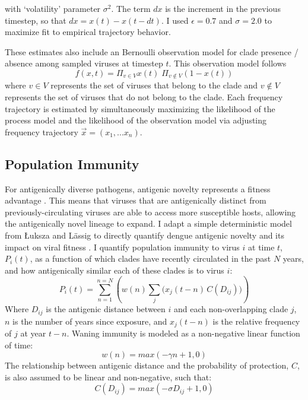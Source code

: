 with `volatility' parameter $\sigma^2$.
The term $dx$ is the increment in the previous timestep, so that $dx = x(t) - x(t-dt)$.
I used $\epsilon = 0.7$ and $\sigma = 2.0$ to maximize fit to empirical trajectory behavior.

These estimates also include an Bernoulli observation model for clade presence / absence among sampled viruses at timestep $t$.
This observation model follows
\begin{equation}
f(x,t) = \Pi_{v \in V} x(t) \; \Pi_{v \notin V} (1-x(t))
\end{equation}
where $v \in V$ represents the set of viruses that belong to the clade and $v \notin V$ represents the set of viruses that do not belong to the clade.
Each frequency trajectory is estimated by simultaneously maximizing the likelihood of the process model and the likelihood of the observation model via adjusting frequency trajectory $\vec{x} = (x_1, ... x_n)$.

\subsection*{Population Immunity}
For antigenically diverse pathogens, antigenic novelty represents a fitness advantage \citep{lipsitch2007patterns}.
This means that viruses that are antigenically distinct from previously-circulating viruses are able to access more susceptible hosts, allowing the antigenically novel lineage to expand.
I adapt a simple deterministic model from {\L}uksza and L\"assig to directly quantify dengue antigenic novelty and its impact on viral fitness \citep{luksza2014predictive}.
I quantify population immunity to virus $i$ at time $t$, $P_i(t)$, as a function of which clades have recently circulated in the past $N$ years, and how antigenically similar each of these clades is to virus $i$:
\begin{equation}
  \label{eq_population_immunity}
P_i(t) = \sum_{n=1}^{n=N} \left(w(n)  \sum_{j} \Big( x_j(t-n) \, C( D_{ij}) \Big) \right)
\end{equation}
Where $D_{ij}$ is the antigenic distance between $i$ and each non-overlapping clade $j$, $n$ is the number of years since exposure, and $x_j(t-n)$ is the relative frequency of $j$ at year $t-n$.
Waning immunity is modeled as a non-negative linear function of time:
\begin{equation}
\label{eq_waning_immunity}
  w(n) = max(-\gamma n + 1, 0)
\end{equation}
The relationship between antigenic distance and the probability of protection, $C$, is also assumed to be linear and non-negative, such that:
\begin{equation}
C(D_{ij}) = max(-\sigma D_{ij} + 1, 0)
\end{equation}

